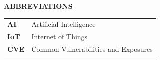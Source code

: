 \begin{center}
	\LARGE \textbf{ABBREVIATIONS}
\end{center}

\vspace{1cm}

\begin{tabular}{l l}
	\textbf{AI} & Artificial Intelligence \\
	\textbf{IoT} & Internet of Things \\
	\textbf{CVE} & Common Vulnerabilities and Exposures \\
\end{tabular}
